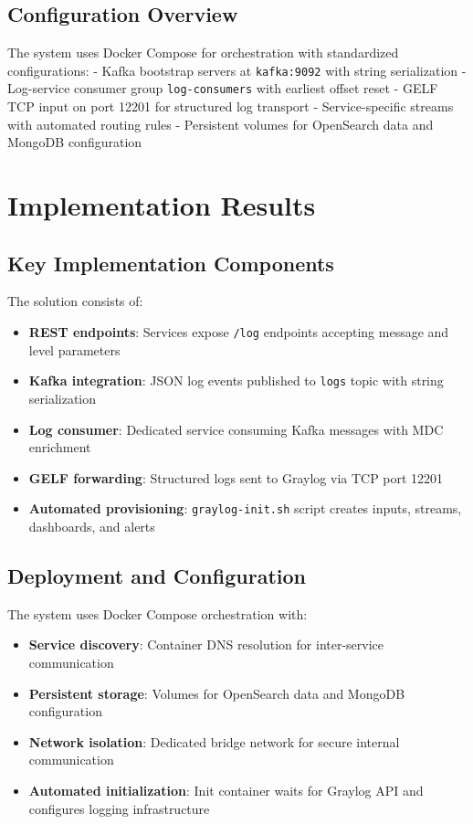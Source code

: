 \documentclass[12pt,a4paper]{report}
\begin{document}
\section{Configuration Overview}
The system uses Docker Compose for orchestration with standardized configurations:
- Kafka bootstrap servers at \texttt{kafka:9092} with string serialization
- Log-service consumer group \texttt{log-consumers} with earliest offset reset
- GELF TCP input on port 12201 for structured log transport
- Service-specific streams with automated routing rules
- Persistent volumes for OpenSearch data and MongoDB configuration

\chapter{Implementation Results}
\section{Key Implementation Components}
The solution consists of:
\begin{itemize}[leftmargin=1.2cm]
  \item \textbf{REST endpoints}: Services expose \texttt{/log} endpoints accepting message and level parameters
  \item \textbf{Kafka integration}: JSON log events published to \texttt{logs} topic with string serialization
  \item \textbf{Log consumer}: Dedicated service consuming Kafka messages with MDC enrichment
  \item \textbf{GELF forwarding}: Structured logs sent to Graylog via TCP port 12201
  \item \textbf{Automated provisioning}: \texttt{graylog-init.sh} script creates inputs, streams, dashboards, and alerts
\end{itemize}

\section{Deployment and Configuration}
The system uses Docker Compose orchestration with:
\begin{itemize}[leftmargin=1.2cm]
  \item \textbf{Service discovery}: Container DNS resolution for inter-service communication
  \item \textbf{Persistent storage}: Volumes for OpenSearch data and MongoDB configuration
  \item \textbf{Network isolation}: Dedicated bridge network for secure internal communication
  \item \textbf{Automated initialization}: Init container waits for Graylog API and configures logging infrastructure
\end{itemize}
\end{document}
